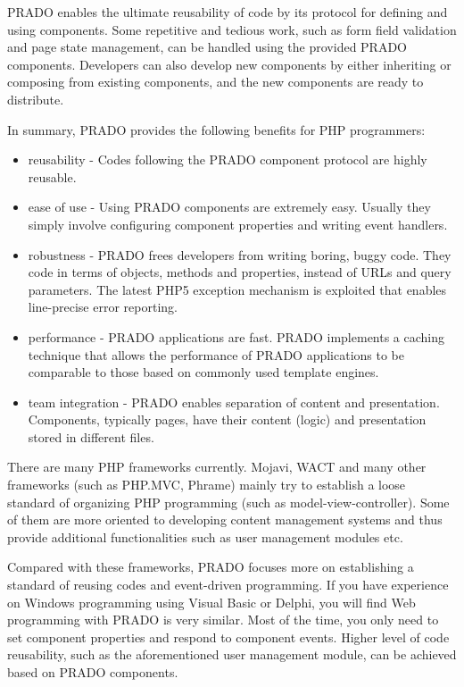 \documentclass{book}
\begin{document}
PRADO enables the ultimate reusability of code by its protocol for
defining and using components. Some repetitive and tedious work,
such as form field validation and page state management, can be
handled using the provided PRADO components. Developers can also
develop new components by either inheriting or composing from
existing components, and the new components are ready to
distribute.


In summary, PRADO provides the following benefits for PHP
programmers:
\begin{itemize}

\item reusability - Codes following the PRADO component protocol
are highly reusable.

\item ease of use - Using PRADO components are extremely easy.
Usually they simply involve configuring component properties and
writing event handlers.

\item robustness - PRADO frees developers from writing boring,
buggy code. They code in terms of objects, methods and properties,
instead of URLs and query parameters. The latest PHP5 exception
mechanism is exploited that enables line-precise error reporting.

\item performance - PRADO applications are fast. PRADO implements
a caching technique that allows the performance of PRADO
applications to be comparable to those based on commonly used
template engines.

\item team integration - PRADO enables separation of content and
presentation. Components, typically pages, have their content
(logic) and presentation stored in different files.

\end{itemize}

There are many PHP frameworks currently. Mojavi, WACT and many
other frameworks (such as PHP.MVC, Phrame) mainly try to establish
a loose standard of organizing PHP programming (such as
model-view-controller). Some of them are more oriented to
developing content management systems and thus provide additional
functionalities such as user management modules etc.


Compared with these frameworks, PRADO focuses more on establishing
a standard of reusing codes and event-driven programming. If you
have experience on Windows programming using Visual Basic or
Delphi, you will find Web programming with PRADO is very similar.
Most of the time, you only need to set component properties and
respond to component events. Higher level of code reusability,
such as the aforementioned user management module, can be achieved
based on PRADO components.
\end{document}
